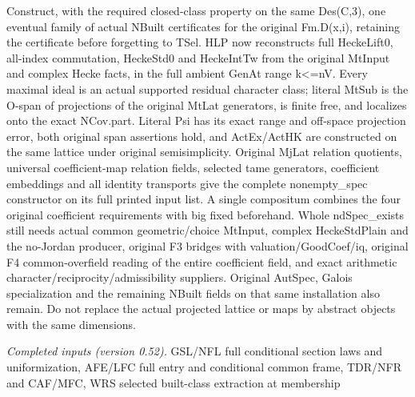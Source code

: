 \documentclass[11pt,a4paper]{article}
\numberwithin{equation}{section}
\theoremstyle{remark}\newtheorem{remark}[theorem]{Remark}
\begin{document}
Construct, with the required closed-class property on the same Des(C,3), one eventual family of actual NBuilt certificates for the original Fm.D(x,i), retaining the certificate before forgetting to TSel. HLP now reconstructs full HeckeLift0, all-index commutation, HeckeStd0 and HeckeIntTw from the original MtInput and complex Hecke facts, in the full ambient GenAt range k<=nV. Every maximal ideal is an actual supported residual character class; literal MtSub is the O-span of projections of the original MtLat generators, is finite free, and localizes onto the exact NCov.part. Literal Psi has its exact range and off-space projection error, both original span assertions hold, and ActEx/ActHK are constructed on the same lattice under original semisimplicity. Original MjLat relation quotients, universal coefficient-map relation fields, selected tame generators, coefficient embeddings and all identity transports give the complete nonempty\_\allowbreak spec constructor on its full printed input list. A single compositum combines the four original coefficient requirements with big fixed beforehand. Whole ndSpec\_\allowbreak exists still needs actual common geometric/choice MtInput, complex HeckeStdPlain and the no-Jordan producer, original F3 bridges with valuation/GoodCoef/iq, original F4 common-overfield reading of the entire coefficient field, and exact arithmetic character/reciprocity/admissibility suppliers. Original AutSpec, Galois specialization and the remaining NBuilt fields on that same installation also remain. Do not replace the actual projected lattice or maps by abstract objects with the same dimensions.

\emph{Completed inputs (version 0.52).} GSL/NFL full conditional section laws and uniformization, AFE/LFC full entry and conditional common frame, TDR/NFR and CAF/MFC, WRS selected built-class extraction at membership
\end{document}
